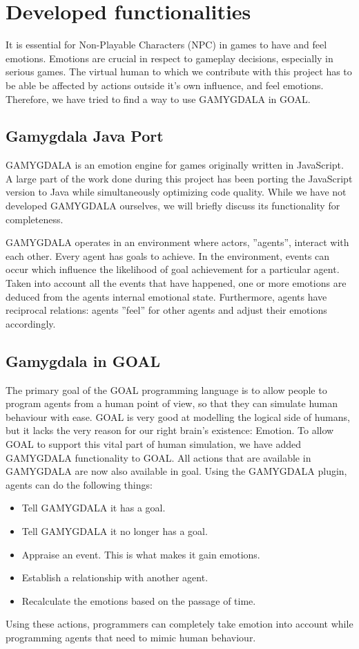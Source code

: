 \section{Developed functionalities}
It is essential for Non-Playable Characters (NPC) in games to have and feel emotions. Emotions are crucial in respect to gameplay decisions, especially in serious games. The virtual human to which we contribute with this project has to be able be affected by actions outside it's own influence, and feel emotions. Therefore, we have tried to find a way to use GAMYGDALA \citep{gamygdala} in GOAL.

\subsection{Gamygdala Java Port}
GAMYGDALA is an emotion engine for games originally written in JavaScript. A large part of the work done during this project has been porting the JavaScript version to Java while simultaneously optimizing code quality. While we have not developed GAMYGDALA ourselves, we will briefly discuss its functionality for completeness.

GAMYGDALA operates in an environment where actors, ''agents'', interact with each other. Every agent has goals to achieve. In the environment, events can occur which influence the likelihood of goal achievement for a particular agent. Taken into account all the events that have happened, one or more emotions are deduced from the agents internal emotional state. Furthermore, agents have reciprocal relations: agents ''feel'' for other agents and adjust their emotions accordingly.

\subsection{Gamygdala in GOAL}
The primary goal of the GOAL programming language is to allow people to program agents from a human point of view, so that they can simulate human behaviour with ease. GOAL is very good at modelling the logical side of humans, but it lacks the very reason for our right brain's existence: Emotion. To allow GOAL to support this vital part of human simulation, we have added GAMYGDALA functionality to GOAL. All actions that are available in GAMYGDALA are now also available in goal. Using the GAMYGDALA plugin, agents can do the following things:
\begin{itemize}
	\item Tell GAMYGDALA it has a goal.
	\item Tell GAMYGDALA it no longer has a goal.
	\item Appraise an event. This is what makes it gain emotions.
	\item Establish a relationship with another agent.
	\item Recalculate the emotions based on the passage of time.
\end{itemize}
Using these actions, programmers can completely take emotion into account while programming agents that need to mimic human behaviour.